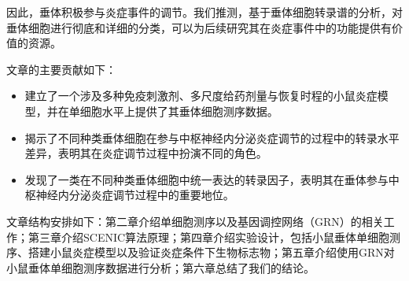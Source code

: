   因此，垂体积极参与炎症事件的调节。我们推测，基于垂体细胞转录谱的分析，对垂体细胞进行彻底和详细的分类，可以为后续研究其在炎症事件中的功能提供有价值的资源。

  文章的主要贡献如下：
\begin{itemize}
    \item 建立了一个涉及多种免疫刺激剂、多尺度给药剂量与恢复时程的小鼠炎症模型，并在单细胞水平上提供了其垂体细胞测序数据。
    \item 揭示了不同种类垂体细胞在参与中枢神经内分泌炎症调节的过程中的转录水平差异，表明其在炎症调节过程中扮演不同的角色。
    \item 发现了一类在不同种类垂体细胞中统一表达的转录因子，表明其在垂体参与中枢神经内分泌炎症调节过程中的重要地位。
\end{itemize}

  文章结构安排如下：第二章介绍单细胞测序以及基因调控网络（GRN）的相关工作；第三章介绍SCENIC算法原理；第四章介绍实验设计，包括小鼠垂体单细胞测序、搭建小鼠炎症模型以及验证炎症条件下生物标志物；第五章介绍使用GRN对小鼠垂体单细胞测序数据进行分析；第六章总结了我们的结论。

